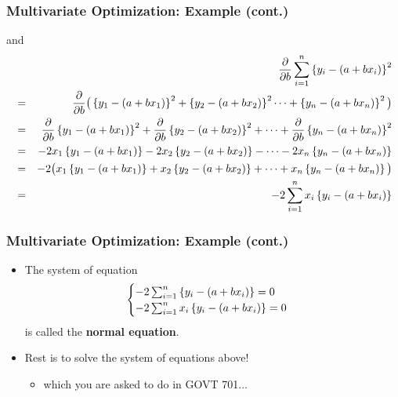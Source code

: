 \documentclass[pdflatex, 12pt]{beamer}
\begin{document}
\begin{frame}
\frametitle{Multivariate Optimization: Example (cont.)}
and
{\footnotesize
\begin{eqnarray}
&& \frac{\partial}{\partial b} \sum_{i = 1}^{n} \left\{y_i - (a + bx_i)\right\}^2 \notag \\
&=& \frac{\partial}{\partial b} \big(\left\{y_1 - (a + bx_1)\right\}^2 + \left\{y_2 - (a + bx_2)\right\}^2 \cdots + \left\{y_n - (a + bx_n)\right\}^2 \big) \notag \\
&=& \frac{\partial}{\partial b} \left\{y_1 - (a + bx_1)\right\}^2 + \frac{\partial}{\partial b} \left\{y_2 - (a + bx_2)\right\}^2 + \cdots + \frac{\partial}{\partial b} \left\{y_n - (a + bx_n)\right\}^2 \notag \\
&=& -2x_1\left\{y_1 - (a + bx_1)\right\} - 2x_2\left\{y_2 - (a + bx_2)\right\} - \cdots - 2x_n\left\{y_n - (a + bx_n)\right\} \notag \\
&=& -2\big(x_1\left\{y_1 - (a + bx_1)\right\} + x_2\left\{y_2 - (a + bx_2)\right\} + \cdots + x_n\left\{y_n - (a + bx_n)\right\}\big) \notag \\
&=& -2 \sum_{i = 1}^{n} x_i\left\{y_i - (a + bx_i)\right\} \notag
\end{eqnarray}
}
\end{frame}

\begin{frame}
\frametitle{Multivariate Optimization: Example (cont.)}
\begin{itemize}
\item The system of equation
 \begin{eqnarray}
 \begin{cases}
 -2 \sum_{i = 1}^{n} \left\{y_i - (a + bx_i)\right\} = 0 \\
 -2 \sum_{i = 1}^{n} x_i\left\{y_i - (a + bx_i)\right\} = 0 \notag
 \end{cases}
 \end{eqnarray}
is called the \textbf{normal equation}. 
\vspace{0.4cm}
\item Rest is to solve the system of equations above!
 \begin{itemize}
 \item which you are asked to do in GOVT 701...
 \end{itemize}
\end{itemize}
\end{frame}
\end{document}
